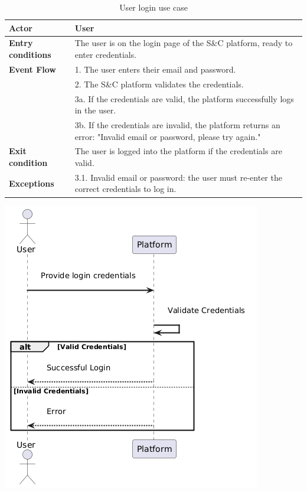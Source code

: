 \begin{table}[h!]
    \centering
    \begin{tabular}{lp{10cm}}
        \textbf{Actor} & User \\ \hline
        \textbf{Entry conditions} & The user is on the login page of the S\&C platform, ready to enter credentials. \\ \hline
        \textbf{Event Flow} & 
        1. The user enters their email and password. \\
        & 2. The S\&C platform validates the credentials. \\
        & 3a. If the credentials are valid, the platform successfully logs in the user. \\
        & 3b. If the credentials are invalid, the platform returns an error: "Invalid email or password, please try again." \\
        \hline
        \textbf{Exit condition} & The user is logged into the platform if the credentials are valid. \\ \hline
        \textbf{Exceptions} & 
        3.1. Invalid email or password: the user must re-enter the correct credentials to log in. \\
    \end{tabular}
    \caption{User login use case}
    \label{tab:user_login}
\end{table}


\begin{center}
    \includegraphics[scale = 1]{Images/ImagesRASD/user_login.png}
\end{center}

